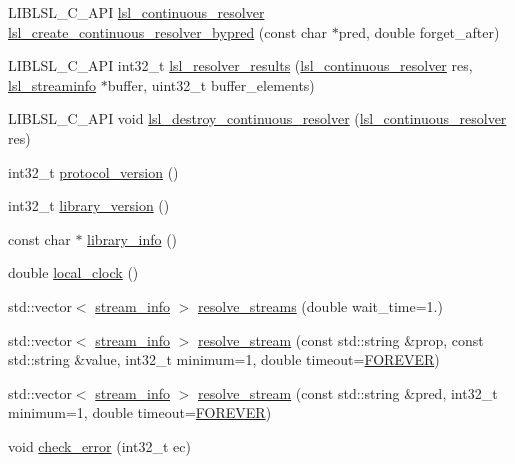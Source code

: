 \begin{DoxyCompactItemize}
\item 
L\+I\+B\+L\+S\+L\+\_\+\+C\+\_\+\+A\+PI \hyperlink{namespacelsl_ab09ea0488f986f056322c3c866dc0a0f}{lsl\+\_\+continuous\+\_\+resolver} \hyperlink{namespacelsl_a632a18d8a150be1ae72efac7074c476d}{lsl\+\_\+create\+\_\+continuous\+\_\+resolver\+\_\+bypred} (const char $\ast$pred, double forget\+\_\+after)
\item 
L\+I\+B\+L\+S\+L\+\_\+\+C\+\_\+\+A\+PI int32\+\_\+t \hyperlink{namespacelsl_ab8f71fa0b8c09cb21a78aa86d03ad8fc}{lsl\+\_\+resolver\+\_\+results} (\hyperlink{namespacelsl_ab09ea0488f986f056322c3c866dc0a0f}{lsl\+\_\+continuous\+\_\+resolver} res, \hyperlink{namespacelsl_aa0a9ce9956061679949daa2e35aae2e8}{lsl\+\_\+streaminfo} $\ast$buffer, uint32\+\_\+t buffer\+\_\+elements)
\item 
L\+I\+B\+L\+S\+L\+\_\+\+C\+\_\+\+A\+PI void \hyperlink{namespacelsl_ab93a61a86bf3e5da34f91255897f6b03}{lsl\+\_\+destroy\+\_\+continuous\+\_\+resolver} (\hyperlink{namespacelsl_ab09ea0488f986f056322c3c866dc0a0f}{lsl\+\_\+continuous\+\_\+resolver} res)
\item 
int32\+\_\+t \hyperlink{namespacelsl_a59009e83a8f0e33643474b373ad2f7f2}{protocol\+\_\+version} ()
\item 
int32\+\_\+t \hyperlink{namespacelsl_a25fc4deea3c2fb0df0744e3a24c56844}{library\+\_\+version} ()
\item 
const char $\ast$ \hyperlink{namespacelsl_a2a348cf022e9862396e4a10f60af42e9}{library\+\_\+info} ()
\item 
double \hyperlink{namespacelsl_ae1766ae2ab66141cb927612e57a0c8c6}{local\+\_\+clock} ()
\item 
std\+::vector$<$ \hyperlink{classlsl_1_1stream__info}{stream\+\_\+info} $>$ \hyperlink{namespacelsl_a2935ff3db04cd640f69943ad14a61915}{resolve\+\_\+streams} (double wait\+\_\+time=1.)
\item 
std\+::vector$<$ \hyperlink{classlsl_1_1stream__info}{stream\+\_\+info} $>$ \hyperlink{namespacelsl_a4edfbcc31f48f27e8f7c2a36b69cd4b9}{resolve\+\_\+stream} (const std\+::string \&prop, const std\+::string \&value, int32\+\_\+t minimum=1, double timeout=\hyperlink{namespacelsl_a74cfbc9077aca21295117217249721ed}{F\+O\+R\+E\+V\+ER})
\item 
std\+::vector$<$ \hyperlink{classlsl_1_1stream__info}{stream\+\_\+info} $>$ \hyperlink{namespacelsl_a824e14275a55df97d0552a91fc2c4097}{resolve\+\_\+stream} (const std\+::string \&pred, int32\+\_\+t minimum=1, double timeout=\hyperlink{namespacelsl_a74cfbc9077aca21295117217249721ed}{F\+O\+R\+E\+V\+ER})
\item 
void \hyperlink{namespacelsl_acce0545ac0a7831acde1a759b778393c}{check\+\_\+error} (int32\+\_\+t ec)
\end{DoxyCompactItemize}

